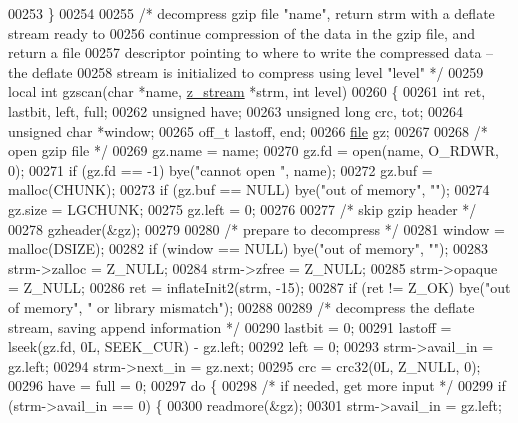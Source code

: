 \begin{DoxyCode}
{00253 \}
00254 
00255 \textcolor{comment}{/* decompress gzip file "name", return strm with a deflate stream ready to}
00256 \textcolor{comment}{   continue compression of the data in the gzip file, and return a file}
00257 \textcolor{comment}{   descriptor pointing to where to write the compressed data -- the deflate}
00258 \textcolor{comment}{   stream is initialized to compress using level "level" */}
00259 local \textcolor{keywordtype}{int} gzscan(\textcolor{keywordtype}{char} *name, \hyperlink{structz__stream__s}{z\_stream} *strm, \textcolor{keywordtype}{int} level)
00260 \{
00261     \textcolor{keywordtype}{int} ret, lastbit, left, full;
00262     \textcolor{keywordtype}{unsigned} have;
00263     \textcolor{keywordtype}{unsigned} \textcolor{keywordtype}{long} crc, tot;
00264     \textcolor{keywordtype}{unsigned} \textcolor{keywordtype}{char} *window;
00265     off\_t lastoff, end;
00266     \hyperlink{structfile}{file} gz;
00267 
00268     \textcolor{comment}{/* open gzip file */}
00269     gz.name = name;
00270     gz.fd = open(name, O\_RDWR, 0);
00271     \textcolor{keywordflow}{if} (gz.fd == -1) bye(\textcolor{stringliteral}{"cannot open "}, name);
00272     gz.buf = malloc(CHUNK);
00273     \textcolor{keywordflow}{if} (gz.buf == NULL) bye(\textcolor{stringliteral}{"out of memory"}, \textcolor{stringliteral}{""});
00274     gz.size = LGCHUNK;
00275     gz.left = 0;
00276 
00277     \textcolor{comment}{/* skip gzip header */}
00278     gzheader(&gz);
00279 
00280     \textcolor{comment}{/* prepare to decompress */}
00281     window = malloc(DSIZE);
00282     \textcolor{keywordflow}{if} (window == NULL) bye(\textcolor{stringliteral}{"out of memory"}, \textcolor{stringliteral}{""});
00283     strm->zalloc = Z\_NULL;
00284     strm->zfree = Z\_NULL;
00285     strm->opaque = Z\_NULL;
00286     ret = inflateInit2(strm, -15);
00287     \textcolor{keywordflow}{if} (ret != Z\_OK) bye(\textcolor{stringliteral}{"out of memory"}, \textcolor{stringliteral}{" or library mismatch"});
00288 
00289     \textcolor{comment}{/* decompress the deflate stream, saving append information */}
00290     lastbit = 0;
00291     lastoff = lseek(gz.fd, 0L, SEEK\_CUR) - gz.left;
00292     left = 0;
00293     strm->avail\_in = gz.left;
00294     strm->next\_in = gz.next;
00295     crc = crc32(0L, Z\_NULL, 0);
00296     have = full = 0;
00297     \textcolor{keywordflow}{do} \{
00298         \textcolor{comment}{/* if needed, get more input */}
00299         \textcolor{keywordflow}{if} (strm->avail\_in == 0) \{
00300             readmore(&gz);
00301             strm->avail\_in = gz.left;
}
\end{DoxyCode}
